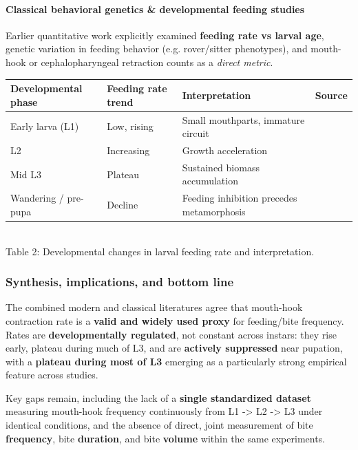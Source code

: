 \documentclass[11pt]{article}
\begin{document}
\paragraph{Classical behavioral genetics \& developmental feeding studies}

Earlier quantitative work explicitly examined \textbf{feeding rate vs larval age}, genetic variation in feeding behavior (e.g. rover/sitter phenotypes), and mouth-hook or cephalopharyngeal retraction counts as a \textit{direct metric}.

\begin{table}[h]
\centering
\begin{tabular}{llll}
\toprule
Developmental phase & Feeding rate trend & Interpretation & Source \\
\midrule
Early larva (L1) & Low, rising & Small mouthparts, immature circuit & \citep{sewell1974genetres,burnet1977genetres} \\
L2 & Increasing & Growth acceleration & \citep{sewell1974genetres,burnet1977genetres} \\
Mid L3 & Plateau & Sustained biomass accumulation & \citep{sewell1974genetres,burnet1977genetres} \\
Wandering / pre-pupa & Decline & Feeding inhibition precedes metamorphosis & \citep{sewell1974genetres,burnet1977genetres,debelle1987heredity} \\
\bottomrule
\end{tabular}
\\[0.5em]
Table 2: Developmental changes in larval feeding rate and interpretation.
\end{table}
\subsubsection*{Synthesis, implications, and bottom line}

The combined modern and classical literatures agree that mouth-hook contraction rate is a \textbf{valid and widely used proxy} for feeding/bite frequency. Rates are \textbf{developmentally regulated}, not constant across instars: they rise early, plateau during much of L3, and are \textbf{actively suppressed} near pupation, with a \textbf{plateau during most of L3} emerging as a particularly strong empirical feature across studies.

Key gaps remain, including the lack of a \textbf{single standardized dataset} measuring mouth-hook frequency continuously from L1 -> L2 -> L3 under identical conditions, and the absence of direct, joint measurement of bite \textbf{frequency}, bite \textbf{duration}, and bite \textbf{volume} within the same experiments.
\end{document}
